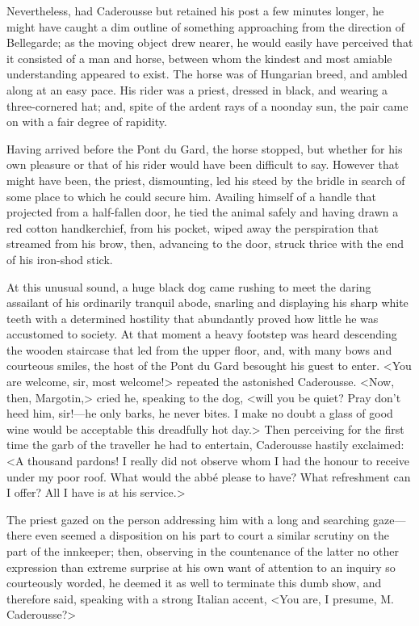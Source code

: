  Nevertheless, had Caderousse but retained his post a few minutes longer, he might have caught a dim outline of something approaching from the direction of Bellegarde; as the moving object drew nearer, he would easily have perceived that it consisted of a man and horse, between whom the kindest and most amiable understanding appeared to exist. The horse was of Hungarian breed, and ambled along at an easy pace. His rider was a priest, dressed in black, and wearing a three-cornered hat; and, spite of the ardent rays of a noonday sun, the pair came on with a fair degree of rapidity. 

 Having arrived before the Pont du Gard, the horse stopped, but whether for his own pleasure or that of his rider would have been difficult to say. However that might have been, the priest, dismounting, led his steed by the bridle in search of some place to which he could secure him. Availing himself of a handle that projected from a half-fallen door, he tied the animal safely and having drawn a red cotton handkerchief, from his pocket, wiped away the perspiration that streamed from his brow, then, advancing to the door, struck thrice with the end of his iron-shod stick. 

 At this unusual sound, a huge black dog came rushing to meet the daring assailant of his ordinarily tranquil abode, snarling and displaying his sharp white teeth with a determined hostility that abundantly proved how little he was accustomed to society. At that moment a heavy footstep was heard descending the wooden staircase that led from the upper floor, and, with many bows and courteous smiles, the host of the Pont du Gard besought his guest to enter.  <You are welcome, sir, most welcome!> repeated the astonished Caderousse. <Now, then, Margotin,> cried he, speaking to the dog, <will you be quiet? Pray don't heed him, sir!—he only barks, he never bites. I make no doubt a glass of good wine would be acceptable this dreadfully hot day.> Then perceiving for the first time the garb of the traveller he had to entertain, Caderousse hastily exclaimed: <A thousand pardons! I really did not observe whom I had the honour to receive under my poor roof. What would the abbé please to have? What refreshment can I offer? All I have is at his service.> 

 The priest gazed on the person addressing him with a long and searching gaze—there even seemed a disposition on his part to court a similar scrutiny on the part of the innkeeper; then, observing in the countenance of the latter no other expression than extreme surprise at his own want of attention to an inquiry so courteously worded, he deemed it as well to terminate this dumb show, and therefore said, speaking with a strong Italian accent, <You are, I presume, M. Caderousse?> 

